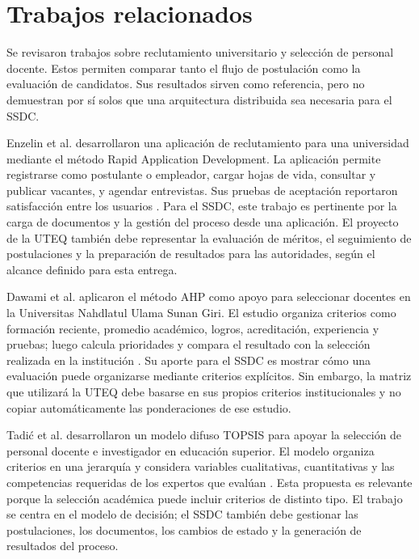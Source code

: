 \section{Trabajos relacionados}

Se revisaron trabajos sobre reclutamiento universitario y selección de personal docente. Estos permiten comparar tanto el flujo de postulación como la evaluación de candidatos. Sus resultados sirven como referencia, pero no demuestran por sí solos que una arquitectura distribuida sea necesaria para el SSDC.

Enzelin et al. desarrollaron una aplicación de reclutamiento para una universidad mediante el método Rapid Application Development. La aplicación permite registrarse como postulante o empleador, cargar hojas de vida, consultar y publicar vacantes, y agendar entrevistas. Sus pruebas de aceptación reportaron satisfacción entre los usuarios \cite{enzelin2024recruitment}. Para el SSDC, este trabajo es pertinente por la carga de documentos y la gestión del proceso desde una aplicación. El proyecto de la UTEQ también debe representar la evaluación de méritos, el seguimiento de postulaciones y la preparación de resultados para las autoridades, según el alcance definido para esta entrega.

Dawami et al. aplicaron el método AHP como apoyo para seleccionar docentes en la Universitas Nahdlatul Ulama Sunan Giri. El estudio organiza criterios como formación reciente, promedio académico, logros, acreditación, experiencia y pruebas; luego calcula prioridades y compara el resultado con la selección realizada en la institución \cite{dawami2022ahp}. Su aporte para el SSDC es mostrar cómo una evaluación puede organizarse mediante criterios explícitos. Sin embargo, la matriz que utilizará la UTEQ debe basarse en sus propios criterios institucionales y no copiar automáticamente las ponderaciones de ese estudio.

Tadić et al. desarrollaron un modelo difuso TOPSIS para apoyar la selección de personal docente e investigador en educación superior. El modelo organiza criterios en una jerarquía y considera variables cualitativas, cuantitativas y las competencias requeridas de los expertos que evalúan \cite{tadic2022fuzzy}. Esta propuesta es relevante porque la selección académica puede incluir criterios de distinto tipo. El trabajo se centra en el modelo de decisión; el SSDC también debe gestionar las postulaciones, los documentos, los cambios de estado y la generación de resultados del proceso.

